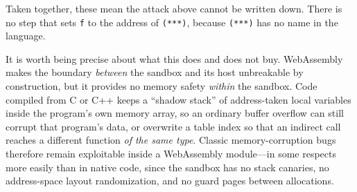 Taken together, these mean the attack above cannot be written down.
There is no step that sets \texttt{f} to the address of
\texttt{(***)}, because \texttt{(***)} has no name in the
language.

It is worth being precise about what this does and does not buy.
WebAssembly makes the boundary \emph{between} the sandbox and its host
unbreakable by construction, but it provides no memory safety
\emph{within} the sandbox.  Code compiled from C or C++ keeps a
``shadow stack'' of address-taken local variables inside the program's
own memory array, so an ordinary buffer overflow can still corrupt that
program's data, or overwrite a table index so that an indirect call
reaches a different function \emph{of the same type}.  Classic
memory-corruption bugs therefore remain exploitable inside a
WebAssembly module---in some respects more easily than in native code,
since the sandbox has no stack canaries, no address-space layout
randomization, and no guard pages between
allocations.
